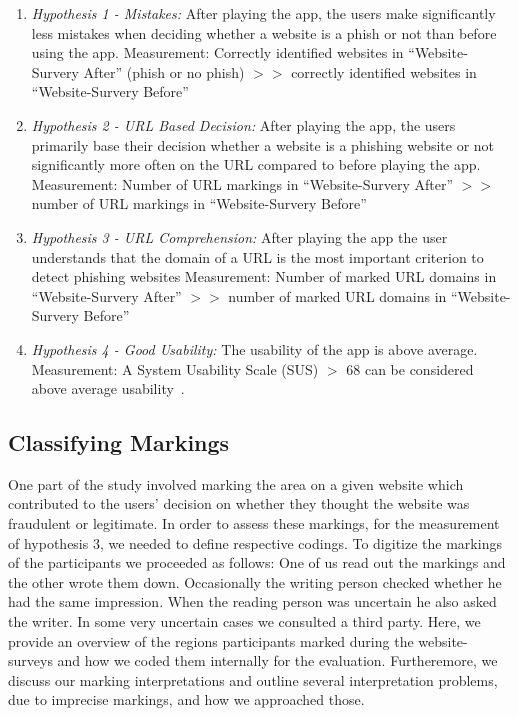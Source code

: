 \begin{enumerate}
	\item \textit{Hypothesis 1 - Mistakes:} After playing the app, the users make significantly less mistakes when deciding whether a website is a phish or not than before using the app.\newline
	Measurement: Correctly identified websites in ``Website-Survery After'' (phish or no phish) $>>$ correctly identified websites in ``Website-Survery Before''
	\item \textit{Hypothesis 2 - URL Based Decision:} After playing the app, the users primarily base their decision whether a website is a phishing website or not significantly more often on the URL compared to before playing the app.\newline
	Measurement: Number of URL markings in ``Website-Survery After'' $>>$ number of URL markings in ``Website-Survery Before''
	\item \textit{Hypothesis 3 - URL Comprehension:} After playing the app the user understands that the domain of a URL is the most important criterion to detect phishing websites\newline
Measurement: Number of marked URL domains in ``Website-Survery After''  $>>$ number of marked URL domains in ``Website-Survery Before'' 
	\item \textit{Hypothesis 4 - Good Usability:} The usability of the app is above average. \newline
Measurement: A System Usability Scale (SUS) $>$ 68 can be considered above average usability~\cite{sus}.
\end{enumerate}

\subsection{Classifying Markings}
\label{s:markings}
One part of the study involved marking the area on a given website which contributed to the users' decision on whether they thought the website was fraudulent or legitimate.
In order to assess these markings, for the measurement of hypothesis 3, we needed to define respective codings.
To digitize the markings of the participants we proceeded as follows:
One of us read out the markings and the other wrote them down. Occasionally the writing person checked whether he had the same impression. When the reading person was uncertain he also asked the writer. In some very uncertain cases we consulted a third party.
Here, we provide an overview of the regions participants marked during the website-surveys and how we coded them internally for the evaluation.
Furtheremore, we discuss our marking interpretations and outline several interpretation problems, due to imprecise markings, and how we approached those.

